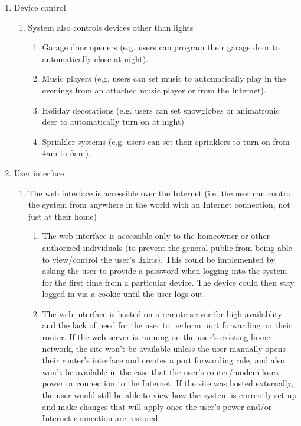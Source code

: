 \documentclass[12pt]{article}
\begin{document}
\begin{enumerate}[resume]
    \item Device control
        \begin{enumerate}
            \item System also controls devices other than lights
                \begin{enumerate}
                    \item Garage door openers (e.g. users can program their garage door to automatically close at night).
                    \item Music players (e.g. users can set music to automatically play in the evenings from an attached music player or from the Internet).
                    \item Holiday decorations (e.g. users can set snowglobes or animatronic deer to automatically turn on at night)
                    \item Sprinkler systems (e.g. users can set their sprinklers to turn on from 4am to 5am).
                \end{enumerate}
        \end{enumerate}
    \item User interface
        \begin{enumerate}
            \item The web interface is accessible over the Internet (i.e. the user can control the system from anywhere in the world with an Internet connection, not just at their home)
                \begin{enumerate}
                    \item The web interface is accessible only to the homeowner or other authorized individuals (to prevent the general public from being able to view/control the user's lights).  This could be implemented by asking the user to provide a password when logging into the system for the first time from a particular device.  The device could then stay logged in via a cookie until the user logs out.
                    \item The web interface is hosted on a remote server for high availablity and the lack of need for the user to perform port forwarding on their router.  If the web server is running on the user's existing home network, the site won't be available unless the user manually opens their router's interface and creates a port forwarding rule, and also won't be available in the case that the user's router/modem loses power or connection to the Internet.  If the site was hosted externally, the user would still be able to view how the system is currently set up and make changes that will apply once the user's power and/or Internet connection are restored.

\end{enumerate}
\end{enumerate}
\end{enumerate}
\end{document}
